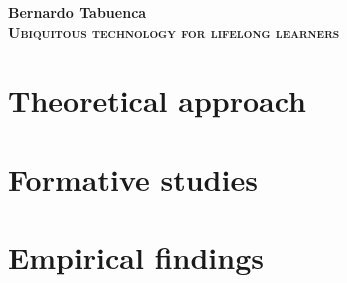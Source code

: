 \documentclass[a4paper,12pt,twoside,openright]{book}
\begin{document}
\nocite{*} %

\begin{titlepage}
	\null\vfill
	\center
		\Large
		\textbf{Bernardo Tabuenca}\\
		\vspace*{1em}
	\Huge
	\textbf{\textsc{Ubiquitous technology for lifelong learners}}\\
	\vfill\null
	
	\clearpage{\pagestyle{empty}\cleardoublepage}
\end{titlepage}
	
\frontmatter	
	\tableofcontents
	
	\cleardoublepage
	\listoffigures
	
	\cleardoublepage	
	\listoftables
	
	
	\clearpage{\pagestyle{empty}\cleardoublepage}
	\pagestyle{fancy}
	
\mainmatter
	
	
		\clearpage{\pagestyle{empty}\cleardoublepage}


	\part{Theoretical approach}
		
		
		
		\clearpage{\pagestyle{empty}\cleardoublepage}	
		
	\part{Formative studies}
			
		
				
		\clearpage{\pagestyle{empty}\cleardoublepage}	
	
	\part{Empirical findings}
		
		
		
		\clearpage{\pagestyle{empty}\cleardoublepage}	

\backmatter

	\renewcommand{\bibname}{References}
	
	\clearpage{\pagestyle{empty}\cleardoublepage}

	\appendix
		
		
		
	\clearpage{\pagestyle{empty}\cleardoublepage}
	\clearpage{\pagestyle{empty}\cleardoublepage}
\end{document}
